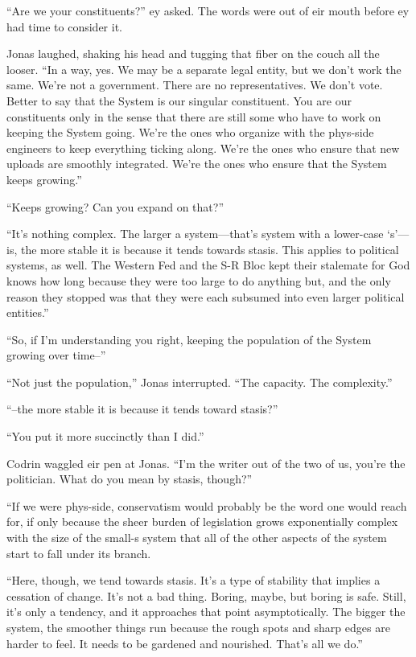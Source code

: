 ``Are we your constituents?'' ey asked. The words were out of eir mouth before ey had time to consider it.

Jonas laughed, shaking his head and tugging that fiber on the couch all the looser. ``In a way, yes. We may be a separate legal entity, but we don't work the same. We're not a government. There are no representatives. We don't vote. Better to say that the System is our singular constituent. You are our constituents only in the sense that there are still some who have to work on keeping the System going. We're the ones who organize with the phys-side engineers to keep everything ticking along. We're the ones who ensure that new uploads are smoothly integrated. We're the ones who ensure that the System keeps growing.''

``Keeps growing? Can you expand on that?''

``It's nothing complex. The larger a system---that's system with a lower-case `s'---is, the more stable it is because it tends towards stasis. This applies to political systems, as well. The Western Fed and the S-R Bloc kept their stalemate for God knows how long because they were too large to do anything but, and the only reason they stopped was that they were each subsumed into even larger political entities.''

``So, if I'm understanding you right, keeping the population of the System growing over time--''

``Not just the population,'' Jonas interrupted. ``The capacity. The complexity.''

``--the more stable it is because it tends toward stasis?''

``You put it more succinctly than I did.''

Codrin waggled eir pen at Jonas. ``I'm the writer out of the two of us, you're the politician. What do you mean by stasis, though?''

``If we were phys-side, conservatism would probably be the word one would reach for, if only because the sheer burden of legislation grows exponentially complex with the size of the small-s system that all of the other aspects of the system start to fall under its branch.

``Here, though, we tend towards stasis. It's a type of stability that implies a cessation of change. It's not a bad thing. Boring, maybe, but boring is safe. Still, it's only a tendency, and it approaches that point asymptotically. The bigger the system, the smoother things run because the rough spots and sharp edges are harder to feel. It needs to be gardened and nourished. That's all we do.''

